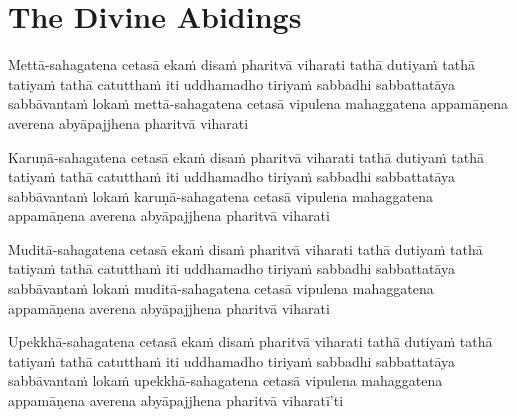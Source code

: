 \suttaRef{[AN 3.65 \& 5.57]}


\section{The Divine Abidings}
\label{divine-abidings}

\begin{leader}
\end{leader}

\begin{pali-hang}
Mettā-sahagatena cetasā ekaṁ disaṁ pharitvā viharati tathā dutiyaṁ tathā tatiyaṁ tathā catutthaṁ iti uddhamadho tiriyaṁ sabbadhi sabbattatāya sabbāvantaṁ lokaṁ mettā-sahagatena cetasā vipulena mahaggatena appamāṇena averena abyāpajjhena pharitvā viharati
\end{pali-hang}

\medskip

\begin{pali-hang}
Karuṇā-sahagatena cetasā ekaṁ disaṁ pharitvā viharati tathā dutiyaṁ tathā tatiyaṁ tathā catutthaṁ iti uddhamadho tiriyaṁ sabbadhi sabbattatāya sabbāvantaṁ lokaṁ karuṇā-sahagatena cetasā vipulena mahaggatena appamāṇena averena abyāpajjhena pharitvā viharati
\end{pali-hang}

\medskip

\begin{pali-hang}
Muditā-sahagatena cetasā ekaṁ disaṁ pharitvā viharati tathā dutiyaṁ tathā tatiyaṁ tathā catutthaṁ iti uddhamadho tiriyaṁ sabbadhi sabbattatāya sabbāvantaṁ lokaṁ muditā-sahagatena cetasā vipulena mahaggatena appamāṇena averena abyāpajjhena pharitvā viharati
\end{pali-hang}

\medskip

\begin{pali-hang}
Upekkhā-sahagatena cetasā ekaṁ disaṁ pharitvā viharati tathā dutiyaṁ tathā tatiyaṁ tathā catutthaṁ iti uddhamadho tiriyaṁ sabbadhi sabbattatāya sabbāvantaṁ lokaṁ upekkhā-sahagatena cetasā vipulena mahaggatena appamāṇena averena abyāpajjhena pharitvā viharatī'ti
\end{pali-hang}

\clearpage

\begin{leader}
\end{leader}

